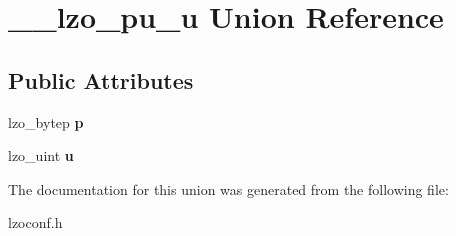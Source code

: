 \hypertarget{union____lzo__pu__u}{\section{\-\_\-\-\_\-lzo\-\_\-pu\-\_\-u \-Union \-Reference}
\label{union____lzo__pu__u}
}
\subsection*{\-Public \-Attributes}
\begin{DoxyCompactItemize}
\item 
\hypertarget{union____lzo__pu__u_a374da31d3a14f0ac2535244ec8f818eb}{lzo\-\_\-bytep {\bfseries p}}\label{union____lzo__pu__u_a374da31d3a14f0ac2535244ec8f818eb}

\item 
\hypertarget{union____lzo__pu__u_a09fc8e3d826dc93cd6d687ac08091b01}{lzo\-\_\-uint {\bfseries u}}\label{union____lzo__pu__u_a09fc8e3d826dc93cd6d687ac08091b01}

\end{DoxyCompactItemize}


\-The documentation for this union was generated from the following file\-:\begin{DoxyCompactItemize}
\item 
lzoconf.\-h\end{DoxyCompactItemize}
